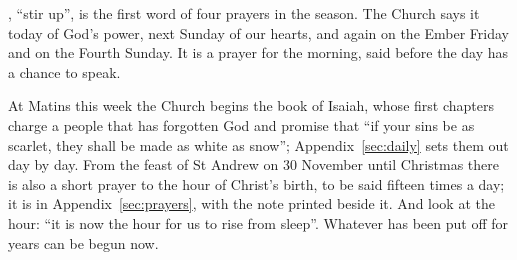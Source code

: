 , ``stir up'', is the first word of four prayers in the season.
The Church says it today of God's power, next Sunday of our hearts, and again
on the Ember Friday and on the Fourth Sunday. It is a prayer for the morning,
said before the day has a chance to speak.

At Matins this week the Church begins the book of Isaiah, whose first chapters
charge a people that has forgotten God and promise that ``if your sins be as
scarlet, they shall be made as white as snow''; Appendix~\ref{sec:daily} sets
them out day by day. From the feast of St Andrew on 30 November until Christmas
there is also a short prayer to the hour of Christ's birth, to be said fifteen
times a day; it is in Appendix~\ref{sec:prayers}, with the note printed beside
it. And look at the hour: ``it is now the hour for us to rise from sleep''.
Whatever has been put off for years can be begun now.
